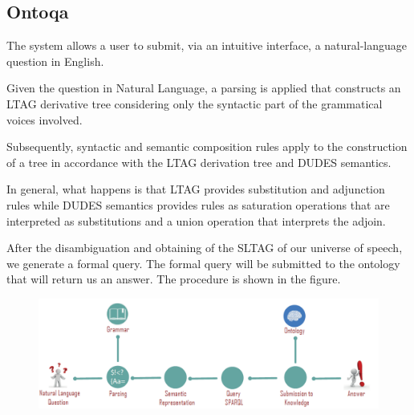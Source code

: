 \subsection{Ontoqa}
The system allows a user to submit, via an intuitive interface, a natural-language question in English.

Given the question in Natural Language, a parsing is applied that constructs an LTAG derivative tree considering only the syntactic part of the grammatical voices involved.

Subsequently, syntactic and semantic composition rules apply to the construction of a tree in accordance with the LTAG derivation tree and DUDES semantics.

In general, what happens is that LTAG provides substitution and adjunction rules while DUDES semantics provides rules as saturation operations that are interpreted as substitutions and a union operation that interprets the adjoin.

After the disambiguation and obtaining of the SLTAG of our universe of speech, we generate a formal query. The formal query will be submitted to the ontology that will return us an answer. The procedure is shown in the figure.

\begin{figure}[tp]
   \centering
    \includegraphics[scale=100]{./fig/ontoqa}
    \label{fig: ontoqa}
\end{figure}